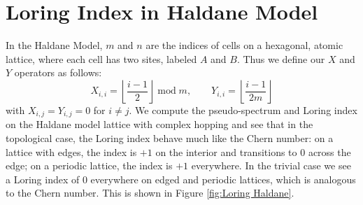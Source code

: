 \documentclass[a4paper]{article}
\begin{document}
\section{Loring Index in Haldane Model}

In the Haldane Model, $m$ and $n$ are the indices of cells on a hexagonal, atomic lattice, where each cell has two sites, labeled $A$ and $B$.
Thus we define our $X$ and $Y$ operators as follows:
$$X_{i,i} = \left\lfloor \frac{i-1}{2} \right\rfloor \;\text{mod}\;m, \quad\quad Y_{i,i} = \left\lfloor \frac{i-1}{2m} \right\rfloor$$
with $X_{i,j} = Y_{i,j} = 0$ for $i \neq j$. 
We compute the pseudo-spectrum and Loring index on the Haldane model lattice with complex hopping and see that in the topological case, the Loring index behave much like the Chern number: on a lattice with edges, the index is $+1$ on the interior and transitions to 0 across the edge; on a periodic lattice, the index is $+1$ everywhere. In the trivial case we see a Loring index of 0 everywhere on edged and periodic lattices, which is analogous to the Chern number. This is shown in Figure \ref{fig:Loring Haldane}.
\end{document}

